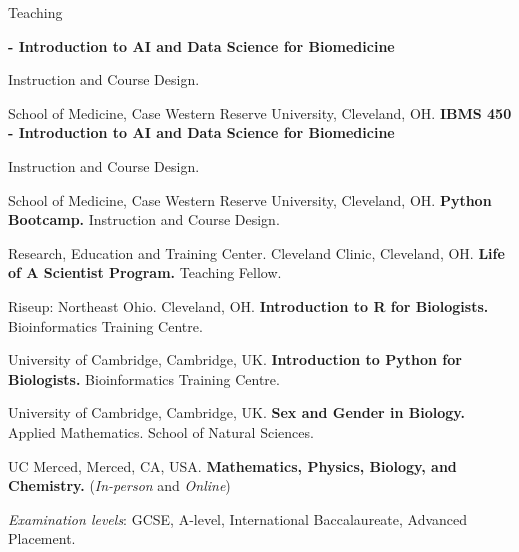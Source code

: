 \begin{rubric}{Teaching}

\entry*[2025-current]%
	\textbf{ - Introduction to AI and Data Science for Biomedicine} \par Instruction and Course Design.\par School of Medicine, Case Western Reserve University, Cleveland, OH.
\entry*[2024-current]%
	\textbf{IBMS 450 - Introduction to AI and Data Science for Biomedicine} \par Instruction and Course Design.\par School of Medicine, Case Western Reserve University, Cleveland, OH.
\entry*[2023-current]%
	\textbf{Python Bootcamp.} Instruction and Course Design. \par Research, Education and Training Center. Cleveland Clinic, Cleveland, OH.
\entry*[2023-]%
	\textbf{Life of A Scientist Program.} Teaching Fellow. \par Riseup: Northeast Ohio. Cleveland, OH.
\entry*[2018-2020]%
	\textbf{Introduction to R for Biologists.} Bioinformatics Training Centre. \par University of Cambridge, Cambridge, UK.
\entry*[2018-2020]%
	\textbf{Introduction to Python for Biologists.} Bioinformatics Training Centre. \par University of Cambridge, Cambridge, UK.
%
 \entry*[Fall 2023]%
	\textbf{Sex and Gender in Biology.} Applied Mathematics. School of Natural Sciences.
 \par UC Merced, Merced, CA, USA.
%
 \entry*[2014--current]%
	\textbf{Mathematics, Physics, Biology, and Chemistry.} (\emph{In-person} and \emph{Online}) \par
\textit{Examination levels}: GCSE,  A-level, International Baccalaureate, Advanced Placement. 
%
\end{rubric}